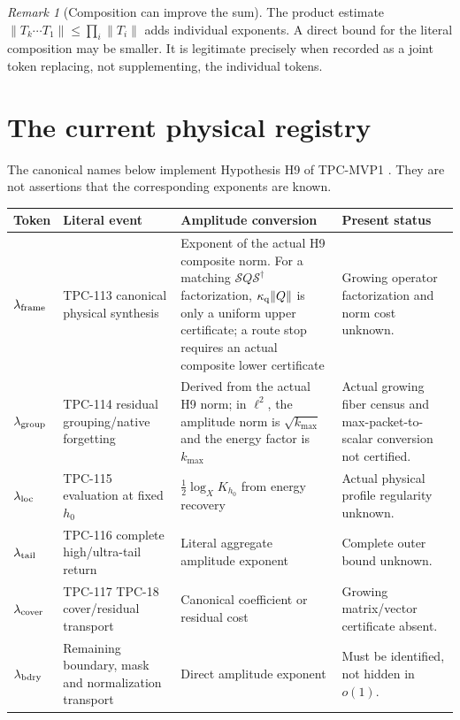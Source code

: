 \documentclass[11pt]{article}
\theoremstyle{definition}
\theoremstyle{remark}
\newtheorem{remark}[theorem]{Remark}
\begin{document}
\begin{remark}[Composition can improve the sum]
The product estimate
\(\|T_k\cdots T_1\|\le\prod_i\|T_i\|\) adds individual exponents.
A direct bound for the literal composition may be smaller.  It is
legitimate precisely when recorded as a joint token replacing, not
supplementing, the individual tokens.
\end{remark}

\section{The current physical registry}

The canonical names below implement Hypothesis H9 of TPC-MVP1
\citep{WangMVP1}.  They are not assertions that the corresponding
exponents are known.

\begin{center}
\small
\begin{tabularx}{\textwidth}{@{}p{}p{}p{}X@{}}
\toprule
Token & Literal event & Amplitude conversion & Present status\\
\midrule
\(\lambda_{\rm frame}\) &
TPC-113 canonical physical synthesis &
Exponent of the actual H9 composite norm.  For a matching
\(\mathcal S Q\mathcal S^\dagger\) factorization,
\(\kappa_{\rm q}\|Q\|\) is only a uniform upper certificate; a route
stop requires an actual composite lower certificate &
Growing operator factorization and norm cost unknown.\\
\(\lambda_{\rm group}\) &
TPC-114 residual grouping/native forgetting &
Derived from the actual H9 norm; in \(\ell^2\), the amplitude norm is
\(\sqrt{k_{\max}}\) and the energy factor is \(k_{\max}\) &
Actual growing fiber census and max-packet-to-scalar conversion not
certified.\\
\(\lambda_{\rm loc}\) &
TPC-115 evaluation at fixed \(h_0\) &
\(\tfrac12\log_X K_{h_0}\) from energy recovery &
Actual physical profile regularity unknown.\\
\(\lambda_{\rm tail}\) &
TPC-116 complete high/ultra-tail return &
Literal aggregate amplitude exponent &
Complete outer bound unknown.\\
\(\lambda_{\rm cover}\) &
TPC-117 TPC-18 cover/residual transport &
Canonical coefficient or residual cost &
Growing matrix/vector certificate absent.\\
\(\lambda_{\rm bdry}\) &
Remaining boundary, mask and normalization transport &
Direct amplitude exponent &
Must be identified, not hidden in \(o(1)\).\\
\bottomrule
\end{tabularx}
\end{center}
\end{document}
